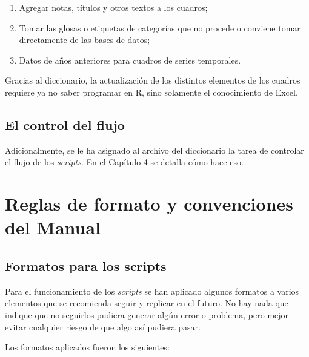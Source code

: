 \documentclass[
  spanish,
]{book}
\begin{document}
\begin{enumerate}
\def\labelenumi{\arabic{enumi}.}
\item
  Agregar notas, títulos y otros textos a los cuadros;
\item
  Tomar las glosas o etiquetas de categorías que no procede o conviene tomar directamente de las bases de datos;
\item
  Datos de años anteriores para cuadros de series temporales.
\end{enumerate}

Gracias al diccionario, la actualización de los distintos elementos de los cuadros requiere ya no saber programar en R, sino solamente el conocimiento de Excel.

\hypertarget{el-control-del-flujo}{%
\section{El control del flujo}\label{el-control-del-flujo}}

Adicionalmente, se le ha asignado al archivo del diccionario la tarea de controlar el flujo de los \emph{scripts}. En el Capítulo 4 se detalla cómo hace eso.

\hypertarget{reglas-de-formato-y-convenciones-del-manual}{%
\chapter{Reglas de formato y convenciones del Manual}\label{reglas-de-formato-y-convenciones-del-manual}}

\hypertarget{formatos-para-los-scripts}{%
\section{Formatos para los scripts}\label{formatos-para-los-scripts}}

Para el funcionamiento de los \emph{scripts} se han aplicado algunos formatos a varios elementos que se recomienda seguir y replicar en el futuro. No hay nada que indique que no seguirlos pudiera generar algún error o problema, pero mejor evitar cualquier riesgo de que algo así pudiera pasar.

Los formatos aplicados fueron los siguientes:
\end{document}
